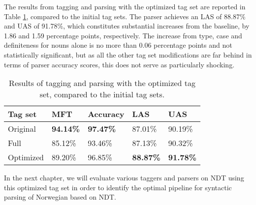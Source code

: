 \documentclass[a4paper,12pt,english]{book}
\begin{document}
The results from tagging and parsing with the optimized tag set are reported in
Table \ref{finalresults}, compared to the initial tag sets. The parser achieves
an LAS of 88.87\% and UAS of 91.78\%, which constitutes substantial increases
from the baseline, by 1.86 and 1.59 percentage points, respectively.  The
increase from type, case and definiteness for nouns alone is no more than 0.06
percentage points and not statistically significant, but as all the other tag
set modifications are far behind in terms of parser accuracy scores, this does
not serve as particularly shocking.

\begin{table}
    \centering
    \smaller[0.5]
    \begin{tabular}{@{}lllll@{}}
        \toprule
        \textbf{Tag set} & \textbf{MFT} & \textbf{Accuracy} &
        \textbf{LAS} & \textbf{UAS} \\
        \midrule
        Original & \textbf{94.14\%} & \textbf{97.47\%} & 87.01\% & 90.19\% \\
        Full & 85.12\% & 93.46\% & 87.13\% & 90.32\% \\
        Optimized & 89.20\% & 96.85\% & \textbf{88.87\%} & \textbf{91.78\%} \\
        \bottomrule
    \end{tabular}
    \caption{Results of tagging and parsing with the optimized tag set, compared to
        the initial tag sets.}
    \label{finalresults}
\end{table}

In the next chapter, we will evaluate various taggers and parsers on NDT using
this optimized tag set in order to identify the optimal pipeline for syntactic
parsing of Norwegian based on NDT.


\end{document}
